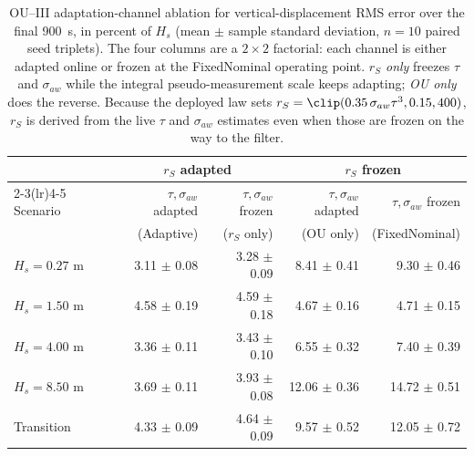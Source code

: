 \begin{table}[t]
  \centering
  \caption{OU--III adaptation-channel ablation for vertical-displacement RMS error over the final \SI{900}{s}, in percent of $H_s$ (mean $\pm$ sample standard deviation, $n=10$ paired seed triplets). The four columns are a $2\times2$ factorial: each channel is either adapted online or frozen at the FixedNominal operating point. \emph{$r_S$ only} freezes $\tau$ and $\sigma_{aw}$ while the integral pseudo-measurement scale keeps adapting; \emph{OU only} does the reverse. Because the deployed law sets $r_S=\clip(0.35\,\sigma_{aw}\tau^{3},0.15,400)$, $r_S$ is derived from the live $\tau$ and $\sigma_{aw}$ estimates even when those are frozen on the way to the filter.}
  \label{tab:ou_mc_channels}
  \footnotesize
  \setlength{\tabcolsep}{4.0pt}
  \begin{tabular}{@{}lrrrr@{}}
    \toprule
    & \multicolumn{2}{c}{$r_S$ adapted} & \multicolumn{2}{c}{$r_S$ frozen} \\
    \cmidrule(lr){2-3}\cmidrule(lr){4-5}
    Scenario & $\tau,\sigma_{aw}$ adapted & $\tau,\sigma_{aw}$ frozen & $\tau,\sigma_{aw}$ adapted & $\tau,\sigma_{aw}$ frozen \\
    & (Adaptive) & ($r_S$ only) & (OU only) & (FixedNominal) \\
    \midrule
    $H_s=0.27$ m & 3.11 $\pm$ 0.08 & 3.28 $\pm$ 0.09 & 8.41 $\pm$ 0.41 & 9.30 $\pm$ 0.46 \\
    $H_s=1.50$ m & 4.58 $\pm$ 0.19 & 4.59 $\pm$ 0.18 & 4.67 $\pm$ 0.16 & 4.71 $\pm$ 0.15 \\
    $H_s=4.00$ m & 3.36 $\pm$ 0.11 & 3.43 $\pm$ 0.10 & 6.55 $\pm$ 0.32 & 7.40 $\pm$ 0.39 \\
    $H_s=8.50$ m & 3.69 $\pm$ 0.11 & 3.93 $\pm$ 0.08 & 12.06 $\pm$ 0.36 & 14.72 $\pm$ 0.51 \\
    Transition & 4.33 $\pm$ 0.09 & 4.64 $\pm$ 0.09 & 9.57 $\pm$ 0.52 & 12.05 $\pm$ 0.72 \\
    \bottomrule
  \end{tabular}
\end{table}


